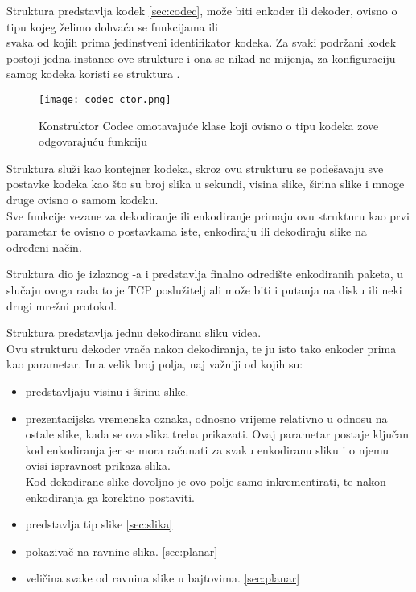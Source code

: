  \label{sec:avcodec}
Struktura  predstavlja kodek \ref{sec:codec}, može biti enkoder ili dekoder, ovisno o tipu kojeg želimo dohvaća se
funkcijama  ili 
\\ 
 svaka od kojih prima jedinstveni identifikator kodeka.
\paraBreak
Za svaki podržani kodek postoji jedna instance ove strukture i ona se nikad ne mijenja, za konfiguraciju samog kodeka
koristi se struktura .

\begin{figure}[h]
  \texttt{[image: codec\_ctor.png]}
  \caption[Konstruktor Codec omotavajuće klase]{\small Konstruktor Codec omotavajuće klase koji ovisno o tipu kodeka zove odgovarajuću funkciju}
\end{figure}

\clearpage


\clearpage
{} \label{sec:avcodec_context}
Struktura  služi kao kontejner kodeka, skroz ovu strukturu se podešavaju sve postavke kodeka
kao što su broj slika u sekundi, visina slike, širina slike i mnoge druge ovisno o samom kodeku. \\
Sve funkcije vezane za dekodiranje ili enkodiranje primaju ovu strukturu kao prvi parametar te ovisno o postavkama iste,
enkodiraju ili dekodiraju slike na određeni način.

 \label{sec:aviocontext}
Struktura  dio je izlaznog -a i predstavlja finalno odredište enkodiranih
paketa, u slučaju ovoga rada to je TCP poslužitelj ali može biti i putanja na disku ili neki drugi mrežni protokol.

 \label{sec:av_frame}
Struktura  predstavlja jednu dekodiranu sliku videa. 
\\
Ovu strukturu dekoder vrača nakon dekodiranja, te ju isto tako enkoder prima kao parametar. \cite{ffmpegDocs}
\paraBreak
Ima velik broj polja, naj važniji od kojih su:
\begin{itemize}
  \item {} predstavljaju visinu i širinu slike.
  \item {} prezentacijska vremenska oznaka, odnosno vrijeme relativno u odnosu na ostale slike, kada se ova
  slika treba prikazati. Ovaj parametar postaje ključan kod enkodiranja jer se mora računati za svaku enkodiranu sliku i o njemu
  ovisi ispravnost prikaza slika. \cite{ffmpegDocs} \\
  Kod dekodirane slike dovoljno je ovo polje samo inkrementirati, te nakon enkodiranja ga korektno postaviti.
  \item {} predstavlja tip slike \ref{sec:slika}
  \item {} pokazivač na ravnine slika. \ref{sec:planar}
  \item {} veličina svake od ravnina slike u bajtovima. \ref{sec:planar}
\end{itemize}

